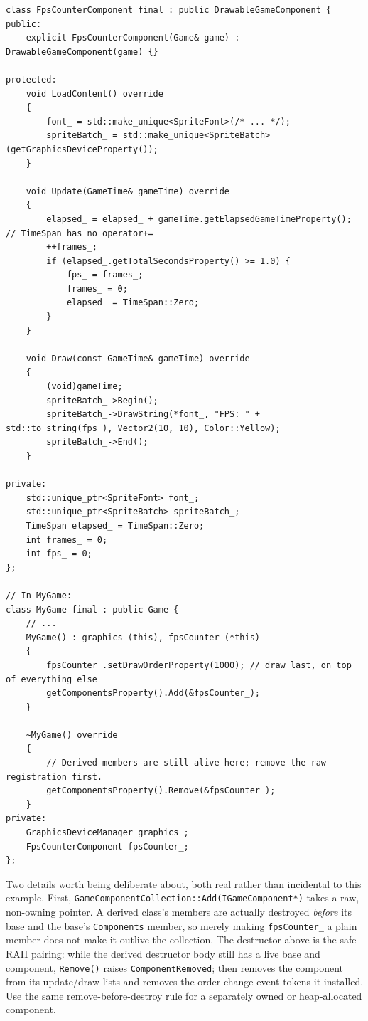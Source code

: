 \begin{lstlisting}
class FpsCounterComponent final : public DrawableGameComponent {
public:
    explicit FpsCounterComponent(Game& game) : DrawableGameComponent(game) {}

protected:
    void LoadContent() override
    {
        font_ = std::make_unique<SpriteFont>(/* ... */);
        spriteBatch_ = std::make_unique<SpriteBatch>(getGraphicsDeviceProperty());
    }

    void Update(GameTime& gameTime) override
    {
        elapsed_ = elapsed_ + gameTime.getElapsedGameTimeProperty(); // TimeSpan has no operator+=
        ++frames_;
        if (elapsed_.getTotalSecondsProperty() >= 1.0) {
            fps_ = frames_;
            frames_ = 0;
            elapsed_ = TimeSpan::Zero;
        }
    }

    void Draw(const GameTime& gameTime) override
    {
        (void)gameTime;
        spriteBatch_->Begin();
        spriteBatch_->DrawString(*font_, "FPS: " + std::to_string(fps_), Vector2(10, 10), Color::Yellow);
        spriteBatch_->End();
    }

private:
    std::unique_ptr<SpriteFont> font_;
    std::unique_ptr<SpriteBatch> spriteBatch_;
    TimeSpan elapsed_ = TimeSpan::Zero;
    int frames_ = 0;
    int fps_ = 0;
};

// In MyGame:
class MyGame final : public Game {
    // ...
    MyGame() : graphics_(this), fpsCounter_(*this)
    {
        fpsCounter_.setDrawOrderProperty(1000); // draw last, on top of everything else
        getComponentsProperty().Add(&fpsCounter_);
    }

    ~MyGame() override
    {
        // Derived members are still alive here; remove the raw registration first.
        getComponentsProperty().Remove(&fpsCounter_);
    }
private:
    GraphicsDeviceManager graphics_;
    FpsCounterComponent fpsCounter_;
};
\end{lstlisting}

Two details worth being deliberate about, both real rather than incidental to this example.
First, \texttt{GameComponentCollection::Add(IGameComponent*)} takes a raw, non-owning
pointer. A derived class's members are actually destroyed \emph{before} its  base
and the base's \texttt{Components} member, so merely making \texttt{fpsCounter\_} a plain member
does not make it outlive the collection. The destructor above is the safe RAII pairing: while the
derived destructor body still has a live base and component, \texttt{Remove()} raises
\texttt{ComponentRemoved};  then removes the component from its update/draw lists
and removes the order-change event tokens it installed. Use the same remove-before-destroy rule
for a separately owned or heap-allocated component.

